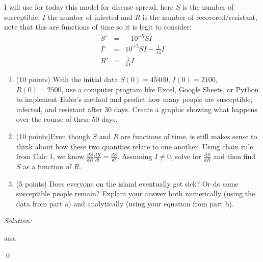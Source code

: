 \documentclass[12pt]{article}
\newenvironment{problem}[1]{\begin{trivlist}
\item[\hskip \labelsep {\bfseries #1}]}{\end{trivlist}}
\newenvironment{sol}
    {\emph{Solution:}
    }
    {
    \qed
    }
\begin{document}

\begin{problem}{Problem 1.}
 \item I will use for today this model for disease spread, here $S$ is the number of susceptible, $I$ the number of infected and $R$ is the number of recovered/resistant, note that this are functions of time so it is legit to consider:
$$\begin{array}{rcl}
S'&=&-10^{-5} S I\\
I'&=&10^{-5}SI -\frac{1}{14}I\\
R'&=&\frac{1}{14}I
\end{array}$$
\begin{enumerate}
	\item (10 points) With the initial data $S(0)=45400$, $I(0)=2100$, $R(0)=2500$, use a computer program like Excel, Google Sheets, or Python to implement Euler's method and predict how many people are susceptible, infected, and resistant after 30 days. Create a graphic showing what happens over the course of these 50 days.
	\item (10 points)Even though $S$ and $R$ are functions of time, is still makes sense to think about how these two quanities relate to one another. Using chain rule from Calc 1, we know $\frac{dS}{dR}\frac{dR}{dt}=\frac{dS}{dt}$. Assuming $I\neq0$, solve for $\frac{dS}{dR}$ and then find $S$ as a function of $R$.
	\item (5 points) Does everyone on the island eventually get sick? Or do some susceptible people remain? Explain your answer both numerically (using the data from part a) and analytically (using your equation from part b).
\end{enumerate}
\end{problem}
\begin{sol}
aaa.
\end{sol}

\newpage
\end{document}
